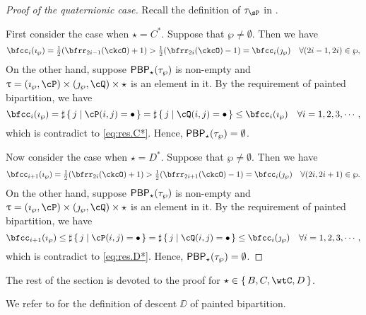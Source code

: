 \documentclass[counting_main.tex]{subfiles}
\begin{document}
\begin{proof}[Proof of {} the quaternionic case]

  Recall the definition of $\tau_{\sP}$ in .

  \smallskip

  First consider the case when $\star = C^{*}$. Suppose that
  $\wp \neq \emptyset$. Then we have
  \begin{equation}\label{eq:res.C*}
    \bfcc_{i}(\imath_{\wp}) = \half(\bfrr_{2i-1}(\ckcO)+1)>
    \half(\bfrr_{2i}(\ckcO)-1) = \bfcc_{i}(\jmath_{\wp})
    \quad \forall (2i-1, 2i)\in \wp,
  \end{equation}
  On the other hand, suppose $\mathsf{PBP}_{\star}(\tau_{\wp})$ is non-empty and
  $\uptau = (\imath_{\wp}, \cP)\times (\jmath_{\wp},\cQ)\times \star$ is an
  element in it. By the requirement of painted bipartition, we have
  \[
    \bfcc_{i}(\imath_{\wp}) = \sharp\set{j| \cP(i,j)=\bullet} = \sharp\set{j| \cQ(i,j)=\bullet} \leq \bfcc_{i}(\imath_{\wp}) \quad \forall i=1,2,3,\cdots,
  \]
  which is contradict to \eqref{eq:res.C*}. Hence,
  $\mathsf{PBP}_{\star}(\tau_{\wp})= \emptyset$.

  \smallskip

  Now consider the case when $\star = D^{*}$. Suppose that $\wp \neq \emptyset$.
  Then we have
  \begin{equation}\label{eq:res.D*}
    \bfcc_{i+1}(\imath_{\wp}) = \half(\bfrr_{2i}(\ckcO)+1)>
    \half(\bfrr_{2i+1}(\ckcO)-1) = \bfcc_{i}(\jmath_{\wp})
    \quad \forall (2i, 2i+1)\in \wp.
  \end{equation}
  On the other hand, suppose $\mathsf{PBP}_{\star}(\tau_{\wp})$ is non-empty and
  $\uptau = (\imath_{\wp}, \cP)\times (\jmath_{\wp},\cQ)\times \star$ is an
  element in it. By the requirement of painted bipartition, we have
  \[
    \bfcc_{i+1}(\imath_{\wp}) \leq \sharp\set{j| \cP(i,j)=\bullet} =\sharp\set{j| \cQ(i,j)=\bullet} \leq \bfcc_{i}(\jmath_{\wp}) \quad \forall i = 1,2,3, \cdots,
  \]
  which is contradict to \eqref{eq:res.D*}. Hence,
  $\mathsf{PBP}_{\star}(\tau_{\wp})= \emptyset$.

\end{proof}


The rest of the section is devoted to the proof for
$\star \in \set{B,C,\wtC,D}$.

We refer to \cite{BMSZ1} for the definition of descent $\DD$ of painted bipartition.


\def\PPm{\wp_{\downarrow}}
\def\uptaum{\uptau_{\downarrow}}
\end{document}
